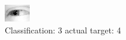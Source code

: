 \begin{figure}[h!]
\begin{center}
\includegraphics[width=0.60\columnwidth]{figures/ID2467_class_3_target_4.png}
\end{center}
\caption{ Classification: 3 actual target: 4}
\label{fig:ID2467_class_3_target_4}
\end{figure}
